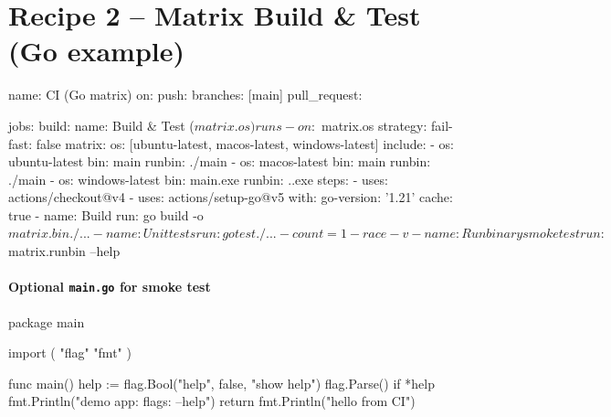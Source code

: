\documentclass[11pt]{article}
\begin{document}
\newpage
\section{Recipe 2 – Matrix Build \& Test (Go example)}
\begin{listing}[H]
\caption{Matrix build across Ubuntu/macOS/Windows with Go toolchain cache}
\begin{yamlcode}
name: CI (Go matrix)
on:
  push:
    branches: [main]
  pull_request:

jobs:
  build:
    name: Build & Test (${{ matrix.os }})
    runs-on: ${{ matrix.os }}
    strategy:
      fail-fast: false
      matrix:
        os: [ubuntu-latest, macos-latest, windows-latest]
        include:
          - os: ubuntu-latest
            bin: main
            runbin: ./main
          - os: macos-latest
            bin: main
            runbin: ./main
          - os: windows-latest
            bin: main.exe
            runbin: .\main.exe
    steps:
      - uses: actions/checkout@v4
      - uses: actions/setup-go@v5
        with:
          go-version: '1.21'
          cache: true
      - name: Build
        run: go build -o ${{ matrix.bin }} ./...
      - name: Unit tests
        run: go test ./... -count=1 -race -v
      - name: Run binary smoke test
        run: ${{ matrix.runbin }} --help
\end{yamlcode}
\end{listing}
\newpage

\paragraph{Optional \texttt{main.go} for smoke test}
\begin{gocode}
package main

import (
  "flag"
  "fmt"
)

func main() {
  help := flag.Bool("help", false, "show help")
  flag.Parse()
  if *help {
    fmt.Println("demo app: flags: --help")
    return
  }
  fmt.Println("hello from CI")
}
\end{gocode}

\newpage
\end{document}
